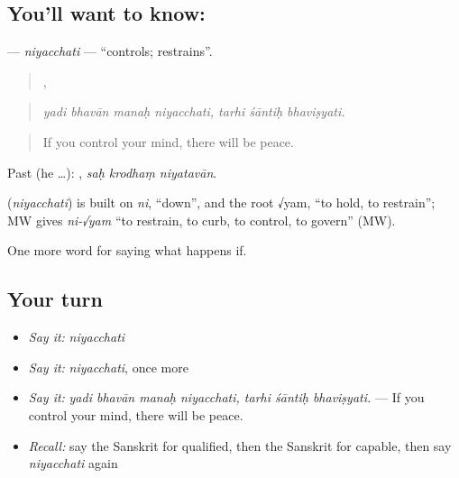 \subsection*{You'll want to know: }
\textbf{} — \emph{niyacchati} — \textquotedblleft{}controls; restrains\textquotedblright{}.

\begin{quote}
   ,   
\end{quote}

\begin{quote}
\emph{yadi bhavān manaḥ niyacchati, tarhi śāntiḥ bhaviṣyati.}
\end{quote}

\begin{quote}
If you control your mind, there will be peace.
\end{quote}

Past (he …):   , \emph{saḥ krodhaṃ niyatavān}.

\begin{cousinweb}
\textbf{} (\emph{niyacchati}) is built on \emph{ni}, \textquotedblleft{}down\textquotedblright{}, and the root √yam, \textquotedblleft{}to hold, to restrain\textquotedblright{}; MW gives \emph{ni-√yam} \textquotedblleft{}to restrain, to curb, to control, to govern\textquotedblright{} (MW).
\end{cousinweb}

\begin{grammarlens}[title={What you've built}]
One more word for saying what happens if.
\end{grammarlens}

\subsection*{Your turn}
\begin{itemize}
\raggedright
  \item \emph{Say it:} \emph{niyacchati}
  \item \emph{Say it:} \emph{niyacchati}, once more
  \item \emph{Say it:} \emph{yadi bhavān manaḥ niyacchati, tarhi śāntiḥ bhaviṣyati.} — If you control your mind, there will be peace.
  \item \emph{Recall:} say the Sanskrit for qualified, then the Sanskrit for capable, then say \emph{niyacchati} again
\end{itemize}

